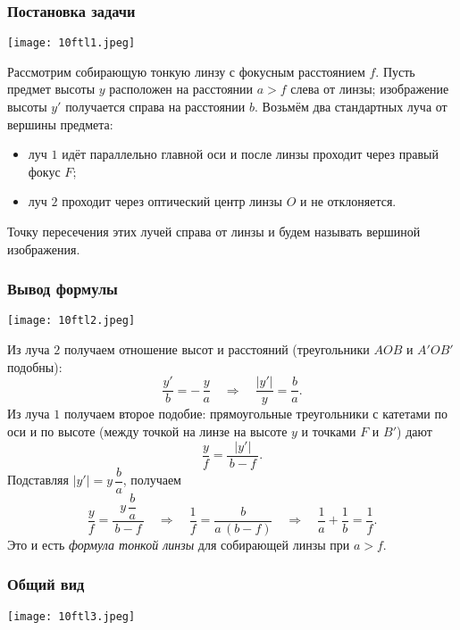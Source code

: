 \documentclass[12pt, a4paper]{article}%
\begin{document}
\subsubsection*{Постановка задачи}

\begin{center}
\texttt{[image: 10ftl1.jpeg]}
\label{fig:mpr}
\end{center} 

Рассмотрим собирающую тонкую линзу с фокусным расстоянием $f$. Пусть предмет высоты $y$ расположен на расстоянии $a>f$ слева от линзы; изображение высоты $y'$ получается справа на расстоянии $b$. Возьмём два стандартных луча от вершины предмета:
\begin{itemize}
  \item луч $1$ идёт параллельно главной оси и после линзы проходит через правый фокус $F$;
  \item луч $2$ проходит через оптический центр линзы $O$ и не отклоняется.
\end{itemize}
Точку пересечения этих лучей справа от линзы и будем называть вершиной изображения.

\subsubsection*{Вывод формулы}

\begin{center}
\texttt{[image: 10ftl2.jpeg]}
\label{fig:mpr}
\end{center}

Из луча $2$ получаем отношение высот и расстояний (треугольники $AOB$ и $A'OB'$ подобны):
\[
\frac{y'}{b}=-\,\frac{y}{a}\quad\Longrightarrow\quad \frac{|y'|}{y}=\frac{b}{a}.
\]
Из луча $1$ получаем второе подобие: прямоугольные треугольники с катетами по оси и по высоте (между точкой на линзе на высоте $y$ и точками $F$ и $B'$) дают
\[
\frac{y}{f}=\frac{|y'|}{\,b-f\,}.
\]
Подставляя \(|y'|=y\,\dfrac{b}{a}\), получаем
\[
\frac{y}{f}=\frac{y\,\dfrac{b}{a}}{\,b-f\,}
\quad\Longrightarrow\quad
\frac{1}{f}=\frac{b}{a\,(b-f)}
\quad\Longrightarrow\quad
\frac{1}{a}+\frac{1}{b}=\frac{1}{f}.
\]
Это и есть \textit{формула тонкой линзы} для собирающей линзы при $a>f$.

\subsubsection*{Общий вид}

\begin{center}
\texttt{[image: 10ftl3.jpeg]}
\label{fig:mpr}
\end{center}
\end{document}
